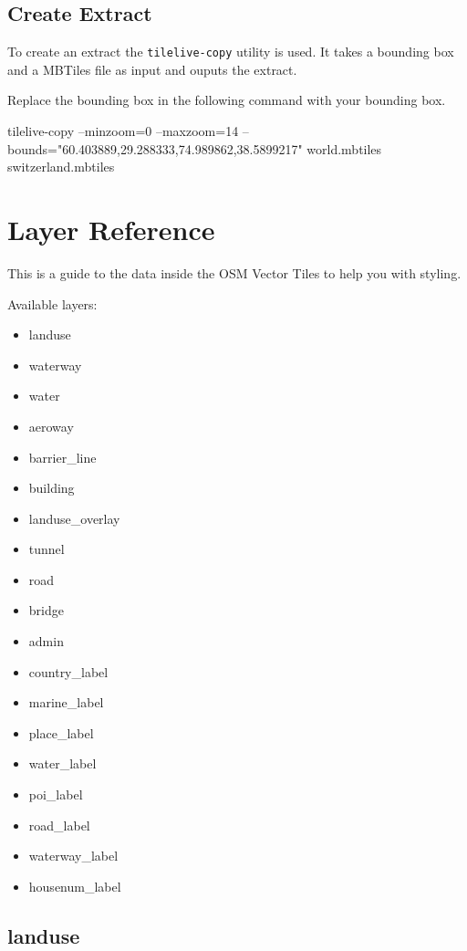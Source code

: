 \subsection*{Create Extract}\label{create-extract}

To create an extract the \texttt{tilelive-copy} utility is used. It takes a
bounding box and a MBTiles file as input and ouputs the extract.

Replace the bounding box in the following command with your bounding
box.

\begin{bashcode}
tilelive-copy --minzoom=0 --maxzoom=14 --bounds="60.403889,29.288333,74.989862,38.5899217" 
world.mbtiles switzerland.mbtiles
\end{bashcode}
\newpage

\section*{Layer Reference}\label{layer-reference}

This is a guide to the data inside the OSM Vector Tiles to help you with
styling.

Available layers:

\begin{itemize}
\item
  landuse
\item
  waterway
\item
  water
\item
  aeroway
\item
  barrier\_line
\item
  building
\item
  landuse\_overlay
\item
  tunnel
\item
  road
\item
  bridge
\item
  admin
\item
  country\_label
\item
  marine\_label
\item
  place\_label
\item
  water\_label
\item
  poi\_label
\item
  road\_label
\item
  waterway\_label
\item
  housenum\_label
\end{itemize}

\subsection*{landuse}\label{landuse}

